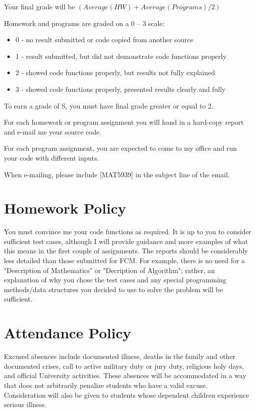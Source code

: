 \documentclass[11pt]{article}
\begin{document}
Your final grade will be $(Average(HW)+Average(Programs)/2)$

Homework and programs are graded on a 0 – 3 scale:

\begin{itemize}
\item 0 - no result submitted or code copied from another source
\item 1 - result submitted, but did not demonstrate code functions properly
\item 2 - showed code functions properly, but results not fully explained
\item 3 - showed code functions properly, presented results clearly and fully
\end{itemize}

To earn a grade of S, you must have final grade greater or equal to 2. 

For each homework or program assignment you will hand in a hard-copy report and e-mail me 
your source code. 

For each program assignment, you are expected to come to my office and run your code with different
inputs.

When e-mailing, please include [MAT5939] in the subject line 
of the email.

\section*{Homework Policy}
\label{sec-6}

You must convince me your code functions as required. It is up to you to 
consider sufficient test cases, although I will provide guidance and more 
examples of what this means in the first couple of assignments. The reports 
should be considerably less detailed than those submitted for FCM. For example, 
there is no need for a "Description of Mathematics" or 
"Decription of Algorithm"; rather, an explanation of why you chose the 
test cases and any special programming methods/data structures you decided 
to use to solve the problem will be sufficient.

\section*{Attendance Policy}
\label{sec-7}

Excused absences include documented illness, deaths in the family and other 
documented crises, call to active military duty or jury duty, religious holy 
days, and official University activities. These absences will be accommodated 
in a way that does not arbitrarily penalize students who have a valid excuse. 
Consideration will also be given to students whose dependent children 
experience serious illness.
\end{document}
